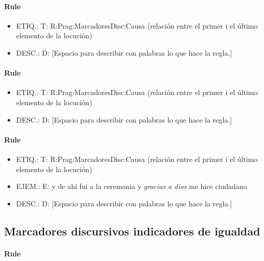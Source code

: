 \documentclass[11pt]{report}
\begin{document}
\paragraph*{Rule}
\begin{itemize}
\item ETIQ.:  T: R:Prag:MarcadoresDisc:Causa (relación entre el primer i el último elemento de la locución)
\item DESC.:  D: [Espacio para describir con palabras lo que hace la regla.]
\end{itemize}

\paragraph*{Rule}
\begin{itemize}
\item ETIQ.:  T: R:Prag:MarcadoresDisc:Causa (relación entre el primer i el último elemento de la locución)
\item DESC.:  D: [Espacio para describir con palabras lo que hace la regla.]
\end{itemize}

\paragraph*{Rule}
\begin{itemize}
\item ETIQ.:  T: R:Prag:MarcadoresDisc:Causa (relación entre el primer i el último elemento de la locución)
\item EJEM.:  E: y de ahí fui a la ceremonia y \emph{gracias a dios} me hice ciudadano
\item DESC.:  D: [Espacio para describir con palabras lo que hace la regla.]
\end{itemize}

\subsection{Marcadores discursivos indicadores de igualdad}
\paragraph*{Rule}
\end{document}
